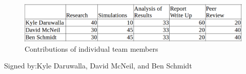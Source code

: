 \begin{figure}
    \centering
    \includegraphics[scale=0.4]{../images/statement_of_work.png}
    \caption{Contributions of individual team members}
    \label{fig:statement_of_work}
\end{figure}
Signed by:Kyle Daruwalla, David McNeil, and Ben Schmidt
